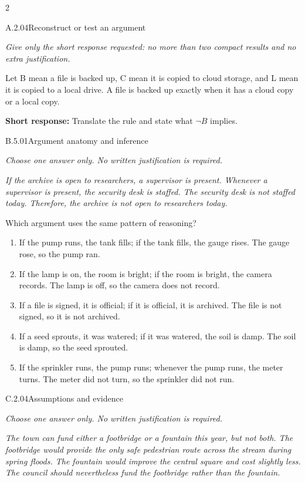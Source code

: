 \documentclass[9pt]{extarticle}
\newcommand{\choice}[1]{\item #1}
\begin{document}
\CoreWorkArea
\FormBreak
{}
\begin{multicols}{2}
\begin{DenseCoreProblem}{A.2.04}{Reconstruct or test an argument}
{\scriptsize\textit{Give only the short response requested: no more than two compact results and no extra justification.}\par}
Let B mean a file is backed up, C mean it is copied to cloud storage, and L mean it is copied to a local drive. A file is backed up exactly when it has a cloud copy or a local copy.

\textbf{Short response:} Translate the rule and state what $\neg B$ implies.
\end{DenseCoreProblem}
\begin{DenseCoreProblem}{B.5.01}{Argument anatomy and inference}
{\scriptsize\textit{Choose one answer only. No written justification is required.}\par}
\emph{If the archive is open to researchers, a supervisor is present. Whenever a supervisor is present, the security desk is staffed. The security desk is not staffed today. Therefore, the archive is not open to researchers today.}

Which argument uses the same pattern of reasoning?
\begin{enumerate}[label=(\alph*)]
  \choice{If the pump runs, the tank fills; if the tank fills, the gauge rises. The gauge rose, so the pump ran.}
  \choice{If the lamp is on, the room is bright; if the room is bright, the camera records. The lamp is off, so the camera does not record.}
  \choice{If a file is signed, it is official; if it is official, it is archived. The file is not signed, so it is not archived.}
  \choice{If a seed sprouts, it was watered; if it was watered, the soil is damp. The soil is damp, so the seed sprouted.}
  \choice{If the sprinkler runs, the pump runs; whenever the pump runs, the meter turns. The meter did not turn, so the sprinkler did not run.}
\end{enumerate}
\end{DenseCoreProblem}
\columnbreak
\begin{DenseCoreProblem}{C.2.04}{Assumptions and evidence}
{\scriptsize\textit{Choose one answer only. No written justification is required.}\par}
\emph{The town can fund either a footbridge or a fountain this year, but not both. The footbridge would provide the only safe pedestrian route across the stream during spring floods. The fountain would improve the central square and cost slightly less. The council should nevertheless fund the footbridge rather than the fountain.}


\end{DenseCoreProblem}
\end{multicols}
\end{document}
